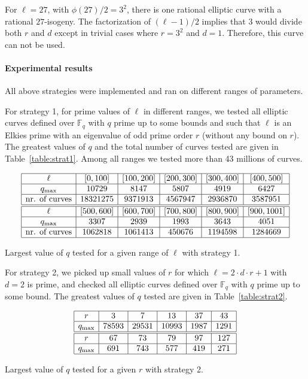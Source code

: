 \documentclass[12pt]{article}
\theoremstyle{plain}
\theoremstyle{definition}
\def\F{\ensuremath{\mathbb{F}}}
\begin{document}
For $\ell = 27$, with $\phi(27)/2 = 3^2$,
there is one rational elliptic curve with a rational $27$-isogeny.
The factorization of $(\ell-1)/2$ implies
that $3$ would divide both $r$ and $d$
except in trivial cases where $r = 3^2$ and $d = 1$.
Therefore, this curve can not be used.

\paragraph{Experimental results}
All above strategies were implemented and ran on different ranges of parameters.

For strategy 1, for prime values of $\ell$ in different ranges,
we tested all elliptic curves defined over $\F_q$
with $q$ prime up to some bounds
and such that $\ell$ is an Elkies prime with an eigenvalue
of odd prime order $r$ (without any bound on $r$).
The greatest values of $q$ and the total number of curves tested
are given in Table~\ref{table:strat1}.
Among all ranges we tested more than 43 millions of curves.
\begin{table}[!ht]
\[
\begin{array}{|*{6}{c|}}
\hline
\ell & [0, 100] & [100, 200] & [200, 300] & [300, 400] & [400, 500] \\
\hline
q_{\max} & 10729 & 8147 & 5807 & 4919 & 6427 \\
\hline
\text{nr. of curves} & 18321275 & 9371913 & 4567947 & 2936870 & 3587951 \\
\hline
\hline
\ell & [500, 600] & [600, 700] & [700, 800] & [800, 900] & [900, 1001] \\
\hline
q_{\max} & 3307 & 2939 & 1993 & 3643 & 4051 \\
\hline
\text{nr. of curves} & 1062818 & 1061413 & 450676 & 1194598 & 1284669 \\
\hline
\end{array}
\]
\caption{Largest value of $q$ tested for a given range of $\ell$ with strategy 1.}
\label{table:strat1}
\end{table}

For strategy 2, we picked up small values of $r$ for which
$\ell = 2 \cdot d \cdot r + 1$ with $d = 2$ is prime,
and checked all elliptic curves defined over $\F_q$ with $q$ prime up
to some bound.
The greatest values of $q$ tested are given in Table~\ref{table:strat2}.
\begin{table}[!ht]
\[
\begin{array}{|*{6}{c|}}
\hline
r & 3 & 7 & 13 & 37 & 43 \\
\hline
q_{\max} & 78593 & 29531 & 10993 & 1987 & 1291 \\
\hline
\hline
r & 67 & 73 & 79 & 97 & 127 \\
\hline
q_{\max} & 691 & 743 & 577 & 419 & 271 \\
\hline
\end{array}
\]
\caption{Largest value of $q$ tested for a given $r$ with strategy 2.}
\label{table:strat2}
\end{table}
\end{document}
